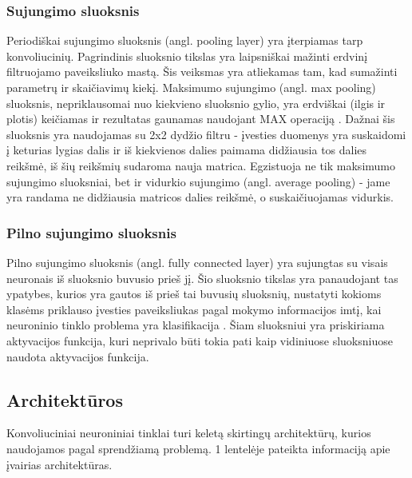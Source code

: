\documentclass{VUMIFPSkursinis}
\begin{document}
\subsubsection{Sujungimo sluoksnis}
Periodiškai sujungimo sluoksnis (angl. pooling layer) yra įterpiamas tarp konvoliucinių. Pagrindinis sluoksnio tikslas yra laipsniškai mažinti erdvinį filtruojamo paveiksliuko mastą.
Šis veiksmas yra atliekamas tam, kad sumažinti parametrų ir skaičiavimų kiekį. Maksimumo sujungimo (angl. max pooling) sluoksnis, nepriklausomai nuo kiekvieno
sluoksnio gylio, yra erdviškai (ilgis ir plotis) keičiamas ir rezultatas gaunamas naudojant MAX operaciją \cite{7927440}. Dažnai šis sluoksnis yra naudojamas su 2x2 dydžio filtru - įvesties 
duomenys yra suskaidomi į keturias lygias dalis ir iš kiekvienos dalies paimama didžiausia tos dalies reikšmė, iš šių reikšmių sudaroma nauja matrica. Egzistuoja ne tik 
maksimumo sujungimo sluoksniai, bet ir vidurkio sujungimo (angl. average pooling) - jame yra randama ne didžiausia matricos dalies reikšmė, o suskaičiuojamas vidurkis.

\subsubsection{Pilno sujungimo sluoksnis}
Pilno sujungimo sluoksnis (angl. fully connected layer) yra sujungtas su visais 
neuronais iš sluoksnio buvusio prieš jį. Šio sluoksnio tikslas yra panaudojant tas ypatybes, kurios yra gautos iš prieš tai buvusių sluoksnių, nustatyti kokioms 
klasėms priklauso įvesties paveiksliukas pagal mokymo informacijos imtį, kai neuroninio tinklo problema yra klasifikacija \cite{layers-fullyconnected}. Šiam 
sluoksniui yra priskiriama aktyvacijos funkcija, kuri neprivalo būti tokia pati kaip vidiniuose sluoksniuose naudota aktyvacijos funkcija. 

\subsection{Architektūros}
Konvoliuciniai neuroniniai tinklai turi keletą skirtingų architektūrų, kurios naudojamos pagal sprendžiamą problemą. 1 lentelėje pateikta informaciją 
apie įvairias architektūras.
\end{document}
